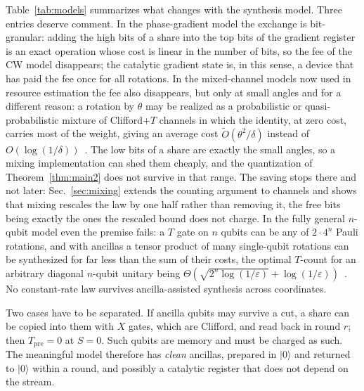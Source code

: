 \documentclass[aps,prx,twocolumn,superscriptaddress,nofootinbib,longbibliography]{revtex4-2}
\theoremstyle{plain}
\theoremstyle{definition}
\theoremstyle{remark}
\newcommand{\Tpre}{T_{\mathrm{pre}}}
\begin{document}
Table~\ref{tab:models} summarizes what changes with the synthesis model. Three entries deserve comment. In the phase-gradient model the exchange is bit-granular: adding the high bits of a share into the top bits of the gradient register is an exact operation whose cost is linear in the number of bits, so the fee of the CW model disappears; the catalytic gradient state is, in this sense, a device that has paid the fee once for all rotations. In the mixed-channel models now used in resource estimation the fee also disappears, but only at small angles and for a different reason: a rotation by $\theta$ may be realized as a probabilistic or quasi-probabilistic mixture of Clifford+$T$ channels in which the identity, at zero cost, carries most of the weight, giving an average cost $\tilde O(\theta^2/\delta)$ instead of $O(\log(1/\delta))$~\cite{Bothe}. The low bits of a share are exactly the small angles, so a mixing implementation can shed them cheaply, and the quantization of Theorem~\ref{thm:main2} does not survive in that range. The saving stops there and not later: Sec.~\ref{sec:mixing} extends the counting argument to channels and shows that mixing rescales the law by one half rather than removing it, the free bits being exactly the ones the rescaled bound does not charge. In the fully general $n$-qubit model even the premise fails: a $T$ gate on $n$ qubits can be any of $2\cdot4^n$ Pauli rotations, and with ancillas a tensor product of many single-qubit rotations can be synthesized for far less than the sum of their costs, the optimal $T$-count for an arbitrary diagonal $n$-qubit unitary being $\Theta(\sqrt{2^n\log(1/\varepsilon)}+\log(1/\varepsilon))$~\cite{GKW}. No constant-rate law survives ancilla-assisted synthesis across coordinates.

Two cases have to be separated. If ancilla qubits may survive a cut, a share can be copied into them with $X$ gates, which are Clifford, and read back in round $r$; then $\Tpre=0$ at $S=0$. Such qubits are memory and must be charged as such. The meaningful model therefore has \emph{clean} ancillas, prepared in $|0\rangle$ and returned to $|0\rangle$ within a round, and possibly a catalytic register that does not depend on the stream.
\end{document}

